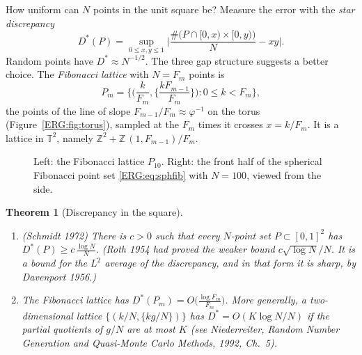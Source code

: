 \documentclass[11pt,openany]{book}
\theoremstyle{plain}
\newtheorem{theorem}{Theorem}[chapter]
\theoremstyle{definition}
\theoremstyle{remark}
\newcommand{\Z}{\mathbb{Z}}
\newcommand{\T}{\mathbb{T}}
\begin{document}
How uniform can $N$ points in the unit square be? Measure the error with the \emph{star discrepancy}
\[
  D^*(P)=\sup_{0\le x,y\le1}\Big|\frac{\#\big(P\cap[0,x)\times[0,y)\big)}{N}-xy\Big| .
\]
Random points have $D^*\approx N^{-1/2}$. The three gap structure suggests a better choice. The
\emph{Fibonacci lattice} with $N=F_m$ points is
\[
  P_m=\Big\{\Big(\frac{k}{F_m},\Big\{\frac{kF_{m-1}}{F_m}\Big\}\Big):0\le k<F_m\Big\},
\]
the points of the line of slope $F_{m-1}/F_m\approx\varphi^{-1}$ on the torus
(Figure~\ref{ERG:fig:torus}), sampled at the $F_m$ times it crosses $x=k/F_m$. It is a lattice in
$\T^2$, namely $\Z^2+\Z\,(1,F_{m-1})/F_m$.

\begin{figure}[ht]
\centering
{}
\qquad
{}
\caption{Left: the Fibonacci lattice $P_{10}$. Right: the front half of the spherical Fibonacci point set
\eqref{ERG:eq:sphfib} with $N=100$, viewed from the side.}
\label{ERG:fig:fib}
\end{figure}

\begin{theorem}[Discrepancy in the square]\label{ERG:thm:discrepancy}\leavevmode
\begin{enumerate}[nosep]
\item (Schmidt 1972) There is $c>0$ such that every $N$-point set $P\subset[0,1]^2$ has
  $D^*(P)\ge c\,\frac{\log N}{N}$. (Roth 1954 had proved the weaker bound $c\sqrt{\log N}/N$. It is a bound for the
  $L^2$ average of the discrepancy, and in that form it is sharp, by Davenport 1956.)
\item The Fibonacci lattice has $D^*(P_m)=O\big(\frac{\log F_m}{F_m}\big)$. More generally, a
  two-dimensional lattice $\{(k/N,\{kg/N\})\}$ has $D^*=O(K\log N/N)$ if the partial quotients of
  $g/N$ are at most $K$ (see Niederreiter, \emph{Random Number Generation and Quasi-Monte Carlo
  Methods}, 1992, Ch.~5).
\end{enumerate}
\end{theorem}
\end{document}
